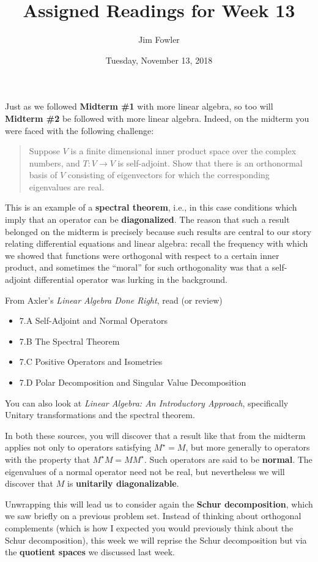 \documentclass{homework}
\author{Jim Fowler}
\title{Assigned Readings for Week 13}
\date{Tuesday, November 13, 2018}
\begin{document}
\maketitle

Just as we followed \textbf{Midterm \#1} with more linear algebra, so
too will \textbf{Midterm \#2} be followed with more linear algebra.
Indeed, on the midterm you were faced with the following challenge:
\begin{quote}
  Suppose $V$ is a finite dimensional inner product space over the
  complex numbers, and $T : V \to V$ is self-adjoint.  Show that there
  is an orthonormal basis of $V$ consisting of eigenvectors for which
  the corresponding eigenvalues are real.
\end{quote}
This is an example of a \textbf{spectral theorem}, i.e., in this case
conditions which imply that an operator can be \textbf{diagonalized}.
The reason that such a result belonged on the midterm is precisely
because such results are central to our story relating differential
equations and linear algebra: recall the frequency with which we
showed that functions were orthogonal with respect to a certain inner
product, and sometimes the ``moral'' for such orthogonality was that a
self-adjoint differential operator was lurking in the background.

From Axler's \textit{Linear Algebra Done Right}, read (or review)
\begin{itemize}
\item \textsection 7.A Self-Adjoint and Normal Operators
\item \textsection 7.B The Spectral Theorem
\item \textsection 7.C Positive Operators and Isometries
\item \textsection 7.D Polar Decomposition and Singular Value Decomposition
\end{itemize}
You can also look at \textit{Linear Algebra: An
  Introductory Approach}, specifically  Unitary transformations and the spectral theorem.

In both these sources, you will discover that a result like that from
the midterm applies not only to operators satisfying $M^\star = M$,
but more generally to operators with the property that
$M^\star M = M M^\star$.  Such operators are said to be
\textbf{normal}.  The eigenvalues of a normal operator need not be
real, but nevertheless we will discover that $M$ is \textbf{unitarily
  diagonalizable}.

Unwrapping this will lead us to consider again the \textbf{Schur
  decomposition}, which we saw briefly on a previous problem set.
Instead of thinking about orthogonal complements (which is how I
expected you would previously think about the Schur decomposition),
this week we will reprise the Schur decomposition but via the
\textbf{quotient spaces} we discussed last week.
\end{document}
